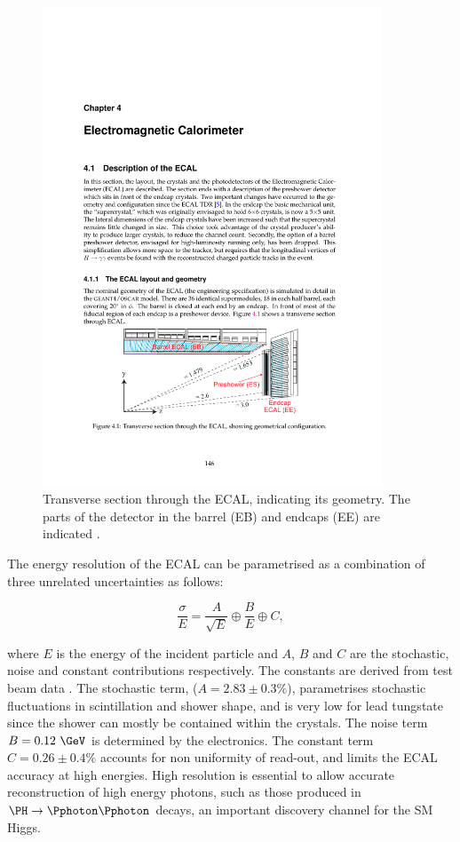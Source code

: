 \begin{figure}[htbp]
   \includegraphics[width=0.9\textwidth]{plots/detector/ecal_layout.pdf}
\caption{Transverse section through the \ac{ECAL}, indicating its geometry. The
parts of the detector in the barrel (EB) and endcaps (EE) are indicated
\cite{TDR}.}
\label{fig:ecal}
\end{figure}

The energy resolution of the \ac{ECAL} can be parametrised as a combination of
three unrelated uncertainties as follows:

\begin{equation}
\frac{\sigma}{E} = \frac{A}{\sqrt{E}} \oplus \frac{B}{E} \oplus C , 
\end{equation}

where $E$ is the energy of the incident particle and $A$, $B$ and $C$ are the
stochastic, noise and constant contributions respectively. The constants are
derived from test beam data \cite{Chatrchyan:2008aa}. The stochastic term, ($A=2.83\pm0.3\%$),
parametrises stochastic fluctuations in scintillation and shower shape, and is
very low for lead tungstate since the shower can mostly be contained within the
crystals. The noise term $B=0.12~\GeV$ is determined by the electronics. The
constant term $C=0.26\pm0.4\%$ accounts for non uniformity of read-out, 
and limits the \ac{ECAL} accuracy at high energies.
High resolution is essential to allow accurate reconstruction of high energy
photons, such as those produced in $\PH\to\Pphoton\Pphoton$ decays, an important
discovery channel for the \ac{SM} Higgs.

